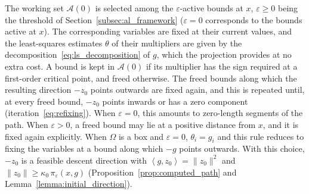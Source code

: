 \documentclass{article}
\numberwithin{equation}{section}
\newcommand{\calA}{{\mathcal{A}}}
\newcommand{\inner}[2]{\left\langle {#1} , {#2} \right\rangle} %
\theoremstyle{plain}
\begin{document}
The working set $\calA(0)$ is selected among the $\varepsilon$-active bounds at $x$, $\varepsilon \ge 0$ being the threshold of Section~\ref{subsec:al_framework} ($\varepsilon = 0$ corresponds to the bounds active at $x$). The corresponding variables are fixed at their current values, and the least-squares estimates $\theta$ of their multipliers are given by the decomposition~\eqref{eq:ls_decomposition} of $g$, which the projection provides at no extra cost. A bound is kept in $\calA(0)$ if its multiplier has the sign required at a first-order critical point, and freed otherwise. The freed bounds along which the resulting direction $-z_0$ points outwards are fixed again, and this is repeated until, at every freed bound, $-z_0$ points inwards or has a zero component (iteration~\eqref{eq:refixing}). When $\varepsilon = 0$, this amounts to zero-length segments of the path. When $\varepsilon > 0$, a freed bound may lie at a positive distance from $x$, and it is fixed again explicitly. When $\Omega$ is a box and $\varepsilon = 0$, $\theta_i = g_i$ and this rule reduces to fixing the variables at a bound along which $-g$ points outwards. With this choice, $-z_0$ is a feasible descent direction with $\inner{g}{z_0} = \|z_0\|^2$ and $\|z_0\| \ge \kappa_0\,\pi_\varepsilon(x,g)$ (Proposition~\ref{prop:computed_path} and Lemma~\ref{lemma:initial_direction}).
\end{document}
